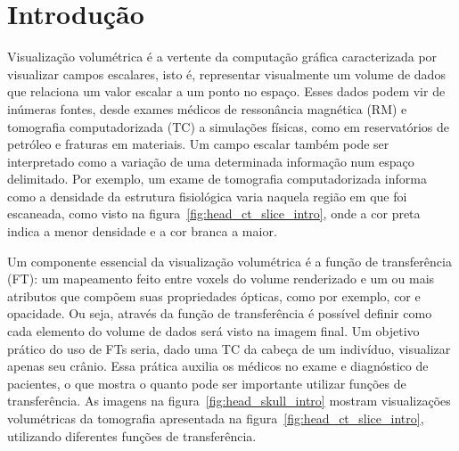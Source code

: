 
\chapter{Introdução}
\label{intro}
	Visualização volumétrica é a vertente da computação gráfica caracterizada por visualizar campos escalares, isto é, representar visualmente um volume de dados que relaciona um valor escalar a um ponto no espaço. Esses dados podem vir de inúmeras fontes, desde exames médicos de ressonância magnética (RM) e tomografia computadorizada (TC) a simulações físicas, como em reservatórios de petróleo e fraturas em materiais. Um campo escalar também pode ser interpretado como a variação de uma determinada informação num espaço delimitado. Por exemplo, um exame de tomografia computadorizada informa como a densidade da estrutura fisiológica varia naquela região em que foi escaneada, como visto na figura~\ref{fig:head_ct_slice_intro}, onde a cor preta indica a menor densidade e a cor branca a maior.
    
    Um componente essencial da visualização volumétrica é a função de transferência (FT): um mapeamento feito entre voxels do volume renderizado e um ou mais atributos que compõem suas propriedades ópticas, como por exemplo, cor e opacidade. Ou seja, através da função de transferência é possível definir como cada elemento do volume de dados será visto na imagem final. Um objetivo prático do uso de FTs seria, dado uma TC da cabeça de um indivíduo, visualizar apenas seu crânio. Essa prática auxilia os médicos no exame e diagnóstico de pacientes, o que mostra o quanto pode ser importante utilizar funções de transferência. As imagens na figura~\ref{fig:head_skull_intro} mostram visualizações volumétricas da tomografia apresentada na figura~\ref{fig:head_ct_slice_intro}, utilizando diferentes funções de transferência.
    
